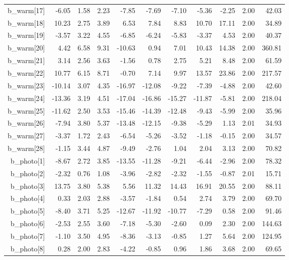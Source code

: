 \documentclass[11pt]{article}
\begin{document}
\begin{table}[ht]
\begin{tabular}{rrrrrrrrrrr}
  b\_warm[17] & -6.05 & 1.58 & 2.23 & -7.85 & -7.69 & -7.10 & -5.36 & -2.25 & 2.00 & 42.03 \\ 
  b\_warm[18] & 10.23 & 2.75 & 3.89 & 6.53 & 7.84 & 8.83 & 10.70 & 17.11 & 2.00 & 34.89 \\ 
  b\_warm[19] & -3.57 & 3.22 & 4.55 & -6.85 & -6.24 & -5.83 & -3.37 & 4.53 & 2.00 & 40.37 \\ 
  b\_warm[20] & 4.42 & 6.58 & 9.31 & -10.63 & 0.94 & 7.01 & 10.43 & 14.38 & 2.00 & 360.81 \\ 
  b\_warm[21] & 3.14 & 2.56 & 3.63 & -1.56 & 0.78 & 2.75 & 5.21 & 8.48 & 2.00 & 61.59 \\ 
  b\_warm[22] & 10.77 & 6.15 & 8.71 & -0.70 & 7.14 & 9.97 & 13.57 & 23.86 & 2.00 & 217.57 \\ 
  b\_warm[23] & -10.14 & 3.07 & 4.35 & -16.97 & -12.08 & -9.22 & -7.39 & -4.88 & 2.00 & 42.60 \\ 
  b\_warm[24] & -13.36 & 3.19 & 4.51 & -17.04 & -16.86 & -15.27 & -11.87 & -5.81 & 2.00 & 218.04 \\ 
  b\_warm[25] & -11.62 & 2.50 & 3.53 & -15.46 & -14.39 & -12.48 & -9.43 & -5.99 & 2.00 & 35.96 \\ 
  b\_warm[26] & -7.94 & 3.80 & 5.37 & -13.48 & -12.15 & -9.38 & -5.29 & 1.13 & 2.01 & 34.93 \\ 
  b\_warm[27] & -3.37 & 1.72 & 2.43 & -6.54 & -5.26 & -3.52 & -1.18 & -0.15 & 2.00 & 34.57 \\ 
  b\_warm[28] & -1.15 & 3.44 & 4.87 & -9.49 & -2.76 & 1.04 & 2.04 & 3.13 & 2.00 & 70.82 \\ 
  b\_photo[1] & -8.67 & 2.72 & 3.85 & -13.55 & -11.28 & -9.21 & -6.44 & -2.96 & 2.00 & 78.32 \\ 
  b\_photo[2] & -2.32 & 0.76 & 1.08 & -3.96 & -2.82 & -2.32 & -1.55 & -0.87 & 2.01 & 15.71 \\ 
  b\_photo[3] & 13.75 & 3.80 & 5.38 & 5.56 & 11.32 & 14.43 & 16.91 & 20.55 & 2.00 & 88.11 \\ 
  b\_photo[4] & 0.33 & 2.03 & 2.88 & -3.57 & -1.84 & 0.54 & 2.74 & 3.79 & 2.00 & 69.70 \\ 
  b\_photo[5] & -8.40 & 3.71 & 5.25 & -12.67 & -11.92 & -10.77 & -7.29 & 0.58 & 2.00 & 91.46 \\ 
  b\_photo[6] & -2.53 & 2.55 & 3.60 & -7.18 & -5.30 & -2.60 & 0.09 & 2.30 & 2.00 & 144.63 \\ 
  b\_photo[7] & -1.10 & 3.50 & 4.95 & -8.36 & -3.13 & -0.85 & 1.27 & 5.64 & 2.00 & 124.95 \\ 
  b\_photo[8] & 0.28 & 2.00 & 2.83 & -4.22 & -0.85 & 0.96 & 1.86 & 3.68 & 2.00 & 69.65 \\ 

\end{tabular}
\end{table}
\end{document}

